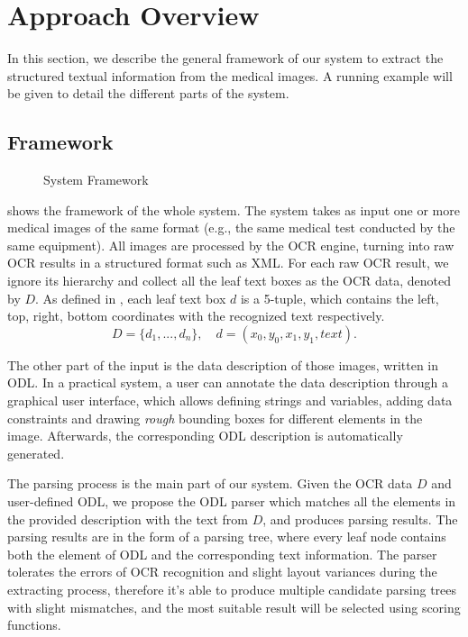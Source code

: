 \section{Approach Overview}
\label{sec:appro}

In this section, we describe the general framework of our system
to extract the structured textual information from the medical images.
A running example will be given to detail the different parts of the system.

\subsection{Framework}
\begin{figure}[th!]
\centering
{}
\caption{System Framework}
\label{fig:framework}
\end{figure}

 shows the framework of the whole system.
The system takes as input one or more medical images of the same format
(e.g., the same medical test conducted by the same equipment).
All images are processed by the OCR engine,
turning into raw OCR results in a structured format such as XML.
For each raw OCR result,
we ignore its hierarchy and collect all the leaf text boxes as the OCR data,
denoted by $D$.
As defined in , each leaf text box $d$ is a 5-tuple,
which contains the left, top, right, bottom coordinates
with the recognized text respectively.
\begin{equation}
  D = \{d_1, ..., d_n\}, \quad d = (x_0, y_0, x_1, y_1, text).
\label{equ:data}
\end{equation}

The other part of the input is the data description of those images,
written in ODL.
In a practical system, a user can annotate the data description through
a graphical user interface, which allows defining strings and variables,
adding data constraints and drawing \textit{rough} bounding boxes for different
elements in the image.
Afterwards, the corresponding ODL description is automatically generated.

The parsing process is the main part of our system.
Given the OCR data $D$ and user-defined ODL, we propose the ODL parser
which matches all the elements in the provided description
with the text from $D$, and produces parsing results.
The parsing results are in the form of a parsing tree, where every leaf node
contains both the element of ODL and the corresponding text information.
The parser tolerates the errors of OCR recognition and slight layout variances
during the extracting process,
therefore it's able to produce multiple candidate parsing trees
with slight mismatches,
and the most suitable result will be selected using scoring functions.

